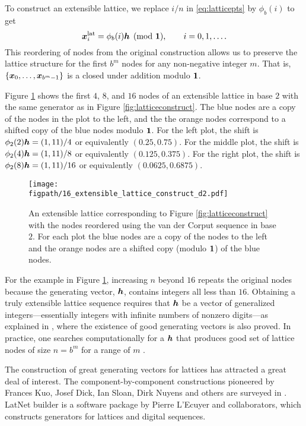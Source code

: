 \documentclass{svproc}
\newcommand{\figpath}{Figures}
\begin{document}
To construct an extensible lattice, we replace $i/n$ in \eqref{eq:latticepts} by $\phi_b(i)$ to get
\begin{equation} \label{eq:extensiblelattice}
	{\boldsymbol{x}}_i^{\text{lat}} =\phi_b( i){\boldsymbol{h}} \pmod {{\boldsymbol{1}}}, \qquad i = 0, 1 , \ldots.
\end{equation}
This reordering of nodes from the original construction allows us to preserve the lattice structure for the first $b^m$ nodes for any non-negative integer $m$. That is, $\{{\boldsymbol{x}}_0, \ldots, {\boldsymbol{x}}_{b^m-1}\}$ is a closed under addition modulo ${\boldsymbol{1}}$.

Figure \ref{fig:extensiblelatticeconstruct} shows the first $4$, $8$, and $16$ nodes of an extensible lattice in base $2$ with the same generator as in Figure \ref{fig:latticeconstruct}.  The blue nodes are a copy of the nodes in the plot to the left, and the the orange nodes correspond to a shifted copy of the blue nodes modulo ${\boldsymbol{1}}$.  For the left plot, the shift is $\phi_2(2){\boldsymbol{h}} = (1,11)/4$ or equivalently $(0.25,0.75)$.  For the middle plot, the shift is $\phi_2(4){\boldsymbol{h}} = (1,11)/8$ or equivalently $(0.125,0.375)$. For the right plot, the shift is $\phi_2(8){\boldsymbol{h}} = (1,11)/16$  or equivalently $(0.0625,0.6875)$.

\begin{figure}
	\centering
	\texttt{[image: \\figpath/16\_extensible\_lattice\_construct\_d2.pdf]}
	\caption{An extensible lattice corresponding to  Figure \ref{fig:latticeconstruct}  with the nodes reordered using the van der Corput sequence in base $2$.  For each plot the blue nodes are a copy of the nodes to the left and the orange nodes are a shifted copy (modulo ${\boldsymbol{1}}$) of the blue nodes. \label{fig:extensiblelatticeconstruct}}
\end{figure}

For the example in Figure \ref{fig:extensiblelatticeconstruct}, increasing $n$ beyond $16$ repeats the original nodes because the generating vector, ${\boldsymbol{h}}$, contains integers all less than $16$.  Obtaining a truly extensible lattice sequence requires that ${\boldsymbol{h}}$ be a vector of generalized integers---essentially integers with infinite numbers of nonzero digits---as explained in \cite{HicNie03a}, where the existence of good generating vectors is also proved.  In practice, one searches computationally for a ${\boldsymbol{h}}$ that produces good set of lattice nodes of size $n = b^m$ for a range of $m$ \cite{HicEtal00}.

The construction of great generating vectors for lattices has attracted a great deal of interest.  The component-by-component constructions pioneered by Frances Kuo, Josef Dick, Ian Sloan, Dirk Nuyens and others are surveyed in \cite[Chapter ?]{DicEtal22a}.  LatNet builder \cite{LEcEtal22a,LatNet} is a software package by Pierre L'Ecuyer and collaborators, which constructs generators for lattices and digital sequences.
\end{document}
